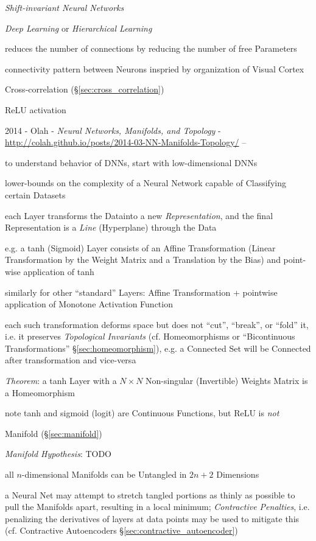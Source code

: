 \emph{Shift-invariant Neural Networks}

\emph{Deep Learning} or \emph{Hierarchical Learning}

reduces the number of connections by reducing the number of free Parameters

connectivity pattern between Neurons inspried by organization of Visual Cortex

Cross-correlation (\S\ref{sec:cross_correlation})

ReLU activation

\asterism

2014 - Olah - \emph{Neural Networks, Manifolds, and Topology} -
\url{http://colah.github.io/posts/2014-03-NN-Manifolds-Topology/} --

to understand behavior of DNNs, start with low-dimensional DNNs

lower-bounds on the complexity of a Neural Network capable of Classifying
certain Datasets

each Layer transforms the Datainto a new \emph{Representation}, and the
final Representation is a \emph{Line} (Hyperplane) through the Data

e.g. a tanh (Sigmoid) Layer consists of an Affine Transformation (Linear
Transformation by the Weight Matrix and a Translation by the Bias) and
point-wise application of tanh

similarly for other ``standard'' Layers: Affine Transformation + pointwise
application of Monotone Activation Function

each such transformation deforms space but does not ``cut'', ``break'', or
``fold'' it, i.e. it preserves \emph{Topological Invariants} (cf. Homeomorphisms
or ``Bicontinuous Transformations'' \S\ref{sec:homeomorphism}), e.g. a Connected
Set will be Connected after transformation and vice-versa

\emph{Theorem}: a tanh Layer with a $N \times N$ Non-singular (Invertible)
Weights Matrix is a Homeomorphism

note tanh and sigmoid (logit) are Continuous Functions, but ReLU is \emph{not}

Manifold (\S\ref{sec:manifold})

\emph{Manifold Hypothesis}: TODO

all $n$-dimensional Manifolds can be Untangled in $2n + 2$ Dimensions

a Neural Net may attempt to stretch tangled portions as thinly as possible to
pull the Manifolds apart, resulting in a local minimum; \emph{Contractive
  Penalties}, i.e. penalizing the derivatives of layers at data points may be
used to mitigate this (cf. Contractive Autoencoders
\S\ref{sec:contractive_autoencoder})

